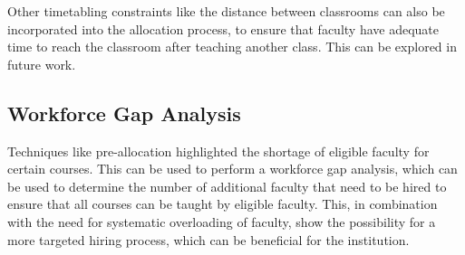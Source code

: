 Other timetabling constraints like the distance between classrooms can also be incorporated into the allocation process, to ensure that faculty have adequate time to reach the classroom after teaching another class. This can be explored in future work.

\subsection{Workforce Gap Analysis}

Techniques like pre-allocation highlighted the shortage of eligible faculty for certain courses. This can be used to perform a workforce gap analysis, which can be used to determine the number of additional faculty that need to be hired to ensure that all courses can be taught by eligible faculty. This, in combination with the need for systematic overloading of faculty, show the possibility for a more targeted hiring process, which can be beneficial for the institution.
